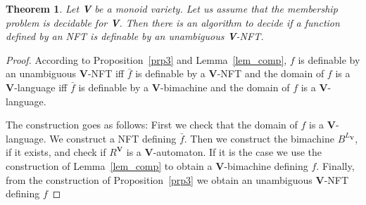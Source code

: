 \documentclass[12pt]{report}
\newtheorem{thm}{Theorem}[section]
\theoremstyle{definition}
\theoremstyle{remark}
\begin{document}
\begin{thm}
\label{v-nft}
Let \textbf V be a monoid variety. Let us assume that the membership problem is decidable for \textbf V.
Then there is an algorithm to decide if a function defined by an NFT is definable by an unambiguous \textbf V-NFT.
\end{thm}
\begin{proof}
According to Proposition~\ref{prp3} and Lemma~\ref{lem_comp}, $f$ is definable by an unambiguous \textbf V-NFT iff $\bar f$ is definable by a \textbf V-NFT and the domain of $f$ is a \textbf V-language iff $\bar f$ is definable by a \textbf V-bimachine and the domain of $f$ is a \textbf V-language.

The construction goes as follows:
First we check that the domain of $f$ is a \textbf V-language.
We construct a NFT defining $\bar f$.
Then we construct the bimachine $B^{L_\mathbf V}$, if it exists, and check if $R^\mathbf V$ is a \textbf V-automaton.
If it is the case we use the construction of Lemma~\ref{lem_comp} to obtain a \textbf V-bimachine defining $f$.
Finally, from the construction of Proposition~\ref{prp3} we obtain an unambiguous \textbf V-NFT defining $f$

\end{proof}
\end{document}
